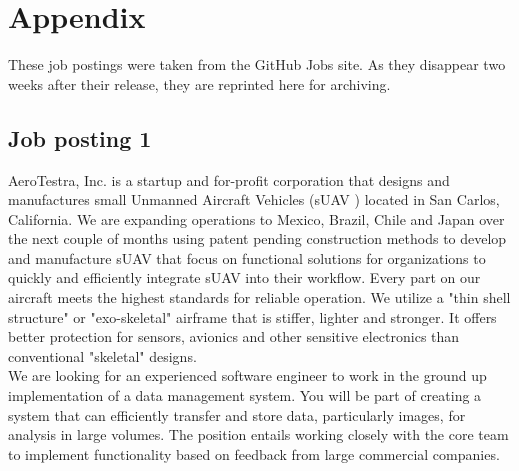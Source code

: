 \chapter{Appendix}\label{chap:appendix}
These job postings were taken from the GitHub Jobs site. As they disappear
two weeks after their release, they are reprinted here for archiving.

\section{Job posting 1}\label{sec:job-posting-one}
AeroTestra, Inc. is a startup and for-profit corporation that designs and
manufactures small Unmanned Aircraft Vehicles (sUAV ) located in San Carlos,
California. We are expanding operations to Mexico, Brazil, Chile and Japan over the
next couple of months using patent pending construction methods to develop and
manufacture sUAV that focus on functional solutions for organizations to quickly
and efficiently integrate sUAV into their workflow. Every part on our aircraft meets
the highest standards for reliable operation. We utilize a "thin shell structure" or
"exo-skeletal" airframe that is stiffer, lighter and stronger. It offers better protection for sensors, avionics and other sensitive electronics than conventional "skeletal" designs.\\

We are looking for an experienced software engineer to work in the ground up implementation of a data management system. You will be part of creating a system that
can efficiently transfer and store data, particularly images, for analysis in large volumes. The position entails working closely with the core team to implement functionality based on feedback from large commercial companies.

